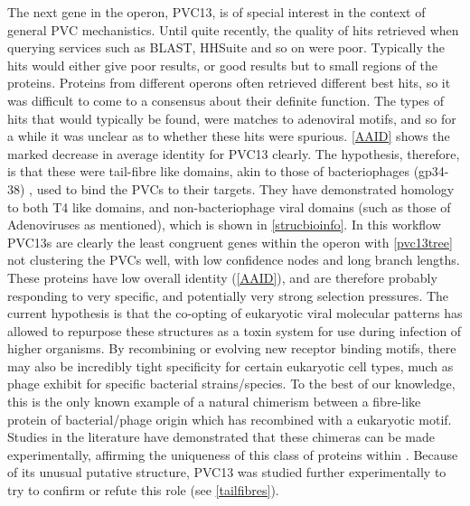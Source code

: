 The next gene in the operon, PVC13, is of special interest in the context of general PVC mechanistics. Until quite recently, the quality of hits retrieved when querying services such as BLAST, HHSuite and so on were poor. Typically the hits would either give poor results, or good results but to small regions of the proteins. Proteins from different operons often retrieved different best hits, so it was difficult to come to a consensus about their definite function. The types of hits that would typically be found, were matches to adenoviral motifs, and so for a while it was unclear as to whether these hits were spurious. \vref{AAID} shows the marked decrease in average identity for PVC13 clearly. The hypothesis, therefore, is that these were tail-fibre like domains, akin to those of bacteriophages (gp34-38) \citep{Bartual2010, Leiman2010}, used to bind the PVCs to their targets. They have demonstrated homology to both T4 like domains, and non-bacteriophage viral domains (such as those of Adenoviruses as mentioned), which is shown in \vref{strucbioinfo}. In this workflow PVC13s are clearly the least congruent genes within the operon with \vref{pvc13tree} not clustering the PVCs well, with low confidence nodes and long branch lengths. These proteins have low overall identity (\vref{AAID}), and are therefore probably responding to very specific, and potentially very strong selection pressures. The current hypothesis is that the co-opting of eukaryotic viral molecular patterns has allowed \Pa{} to repurpose these structures as a toxin system for use during infection of higher organisms. By recombining or evolving new receptor binding motifs, there may also be incredibly tight specificity for certain eukaryotic cell types, much as phage exhibit for specific bacterial strains/species. To the best of our knowledge, this is the only known example of a natural chimerism between a fibre-like protein of bacterial/phage origin which has recombined with a eukaryotic motif. Studies in the literature have demonstrated that these chimeras can be made experimentally, affirming the uniqueness of this class of proteins within \Pa{} \citep{Papanikolopoulou2004}. Because of its unusual putative structure, PVC13 was studied further experimentally to try to confirm or refute this role (see \vref{tailfibres}).

